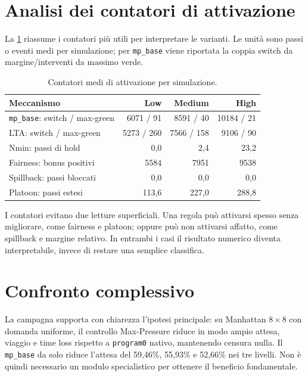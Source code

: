 \documentclass[12pt,a4paper,oneside]{report}
\numberwithin{equation}{chapter}
\begin{document}
\section{Analisi dei contatori di attivazione}

La \cref{tab:activation-manhattan} riassume i contatori più utili per
interpretare le varianti. Le unità sono passi o eventi medi per simulazione;
per \texttt{mp\_base} viene riportata la coppia switch da margine/interventi da
massimo verde.

\begin{table}[htbp]
    \centering
    \caption{Contatori medi di attivazione per simulazione.}
    \label{tab:activation-manhattan}
    \begin{tabular}{lrrr}
        \toprule
        Meccanismo & Low & Medium & High \\
        \midrule
        \texttt{mp\_base}: switch / max-green & 6071 / 91 & 8591 / 40 & 10184 / 21 \\
        LTA: switch / max-green & 5273 / 260 & 7566 / 158 & 9106 / 90 \\
        Nmin: passi di hold & 0,0 & 2,4 & 23,2 \\
        Fairness: bonus positivi & 5584 & 7951 & 9538 \\
        Spillback: passi bloccati & 0,0 & 0,0 & 0,0 \\
        Platoon: passi estesi & 113,6 & 227,0 & 288,8 \\
        \bottomrule
    \end{tabular}
\end{table}

I contatori evitano due letture superficiali. Una regola può attivarsi spesso
senza migliorare, come fairness e platoon; oppure può non attivarsi affatto,
come spillback e margine relativo. In entrambi i casi il risultato numerico
diventa interpretabile, invece di restare una semplice classifica.

\section{Confronto complessivo}

La campagna supporta con chiarezza l'ipotesi principale: su Manhattan
$8\times8$ con domanda uniforme, il controllo Max-Pressure riduce in modo ampio attesa,
viaggio e time loss rispetto a \texttt{program0} nativo, mantenendo censura nulla. Il
\texttt{mp\_base} da solo riduce l'attesa del 59,46\%, 55,93\% e 52,66\% nei
tre livelli. Non è quindi necessario un modulo specialistico per ottenere il
beneficio fondamentale.
\end{document}
